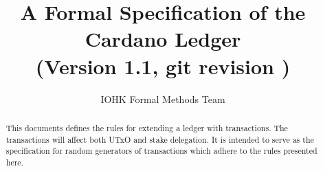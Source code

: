 
\title{A Formal Specification of the Cardano Ledger \\
       {\small (Version 1.1, git revision \gitAbbrevHash\gitDirty)}}

\author{IOHK Formal Methods Team}


\maketitle

\begin{abstract}
This documents defines the rules for extending a ledger with transactions.
The transactions will affect both UTxO and stake delegation.
It is intended to serve as the specification for random generators of transactions
which adhere to the rules presented here.
\end{abstract}
